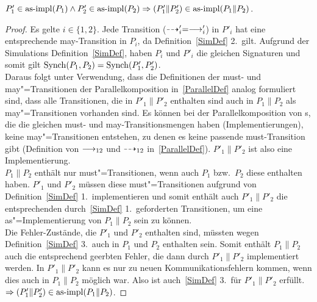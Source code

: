\begin{Lem}
  \label{impParallelLem}
  $P'_1\in\mathrm{as}\text{-}\mathrm{impl} (P_1) \land P'_2 \in\mathrm{as}\text{-}\mathrm{impl} (P_2) \Rightarrow (P'_1\|P'_2)
  \in\mathrm{as}\text{-}\mathrm{impl} (P_1\|P_2)$.

\end{Lem}

\begin{proof}
    Es gelte $i\in\{1,2\}$. Jede Transition ($\may '_i =\must '_i$) in
    $P'_i$ hat eine entsprechende may-Transition in $P_i$, da
    Definition~\ref{SimDef} 2.\ gilt. Aufgrund der Simulations
    Definition~\ref{SimDef}, haben $P_i$ und $P'_i$ die gleichen Signaturen
    und somit gilt $\mathrm{Synch} (P_1,P_2) =\mathrm{Synch} (P'_1,P'_2)$.\\
    Daraus folgt unter Verwendung, dass die Definitionen der must- und
    may"=Transitionen der Parallelkomposition in~\ref{ParallelDef} analog
    formuliert sind, dass alle Transitionen, die in $P'_1\|P'_2$ enthalten
    sind auch in $P_1\|P_2$ als may"=Transitionen vorhanden sind. Es können
    bei der Parallelkomposition von \MEIO{}s, die die gleichen must- und
    may-Transitionsmengen haben (Implementierungen), keine may"=Transitionen
    entstehen, zu denen es keine passende must-Transition gibt (Definition
    von $\must _{12}$ und $\may _{12}$ in~\ref{ParallelDef}). $P'_1\|P'_2$
    ist also eine Implementierung.\\
    $P_1\|P_2$ enthält nur must"=Transitionen, wenn auch $P_1$ bzw.\ $P_2$
    diese enthalten haben. $P'_1$ und $P'_2$ müssen diese must"=Transitionen
    aufgrund von Definition~\ref{SimDef} 1.\ implementieren und somit enthält
    auch $P'_1\|P'_2$ die entsprechenden durch~\ref{SimDef} 1.\ geforderten
    Transitionen, um eine as"=Implementierung von $P_1\|P_2$ sein zu können.\\
    Die Fehler-Zustände, die $P'_1$ und $P'_2$ enthalten sind,
    müssten wegen Definition~\ref{SimDef} 3.\ auch in $P_1$ und $P_2$
    enthalten sein. Somit enthält $P_1\|P_2$ auch die entsprechend geerbten
    Fehler, die dann durch $P'_1\|P'_2$ implementiert werden.
    In $P'_1\|P'_2$ kann es nur zu neuen Kommunikationsfehlern kommen, wenn
    dies auch in $P_1\|P_2$ möglich war. Also ist auch~\ref{SimDef} 3.\ für
    $P'_1\|P'_2$ erfüllt.\\
    $\Rightarrow (P'_1\|P'_2)\in\mathrm{as}\text{-}\mathrm{impl} (P_1\|P_2)$.
\end{proof}

